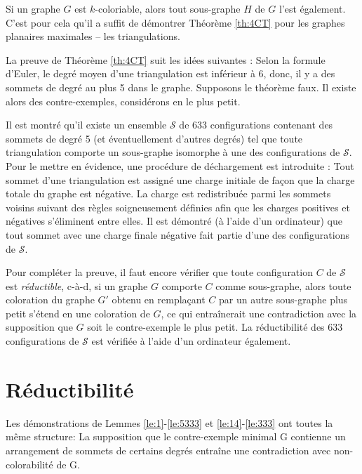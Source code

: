 \documentclass[10pt,a4paper]{article}
\newtheorem{proposition}{Proposition}
\begin{document}
Si un graphe $G$ est $k$-coloriable, alors tout sous-graphe $H$ de $G$ l'est également. C'est pour cela qu'il a suffit de démontrer Théorème \ref{th:4CT} pour les graphes planaires maximales -- les triangulations.




La preuve de Théorème \ref{th:4CT} suit les idées suivantes : Selon la formule d'Euler, le degré moyen d'une triangulation est inférieur à 6, donc, il y a des sommets de degré au plus 5 dans le graphe. Supposons le théorème faux. Il existe alors des contre-exemples, considérons en le plus petit. 

Il est montré qu'il existe un ensemble $\mathcal{S}$ de 633 configurations contenant des sommets de degré 5 (et éventuellement d'autres degrés) tel que toute triangulation comporte un sous-graphe isomorphe à une des configurations de $\mathcal{S}$. Pour le mettre en évidence, une procédure de déchargement est introduite : Tout sommet d'une triangulation est assigné une charge initiale de façon que la charge totale du graphe est négative. La charge est redistribuée parmi les sommets voisins suivant des règles soigneusement définies afin que les charges positives et négatives s'éliminent entre elles. Il est démontré (à l'aide d'un ordinateur) que tout sommet avec une charge finale négative fait partie d'une des configurations de $\mathcal{S}$.

Pour compléter la preuve, il faut encore vérifier que toute configuration $C$ de $\mathcal{S}$ est \emph{réductible}, c-à-d, si un graphe $G$ comporte $C$ comme sous-graphe, alors toute coloration du graphe $G'$ obtenu en remplaçant $C$ par un autre sous-graphe plus petit s'étend en une coloration de $G$, ce qui entraînerait une contradiction avec la supposition que $G$ soit le contre-exemple le plus petit.
La réductibilité des 633 configurations de $\mathcal{S}$ est vérifiée à l'aide d'un ordinateur également.

\newpage





\section{Réductibilité}
\label{chap:red}
Les démonstrations de Lemmes \ref{le:1}-\ref{le:5333} et \ref{le:14}-\ref{le:333} ont toutes la même structure: La supposition que le contre-exemple minimal G contienne un arrangement de sommets de certains degrés entraîne une contradiction avec non-colorabilité de G.
\end{document}
